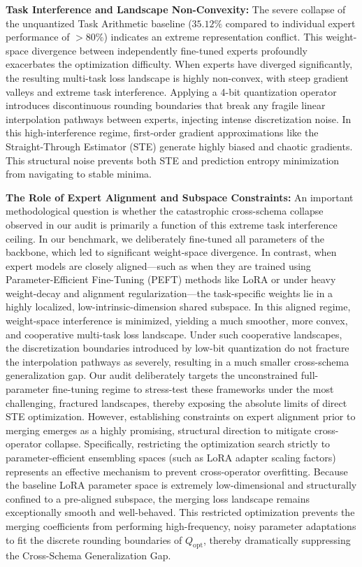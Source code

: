 \textbf{Task Interference and Landscape Non-Convexity:} The severe collapse of the unquantized Task Arithmetic baseline ($35.12\%$ compared to individual expert performance of $>80\%$) indicates an extreme representation conflict. This weight-space divergence between independently fine-tuned experts profoundly exacerbates the optimization difficulty. When experts have diverged significantly, the resulting multi-task loss landscape is highly non-convex, with steep gradient valleys and extreme task interference. Applying a 4-bit quantization operator introduces discontinuous rounding boundaries that break any fragile linear interpolation pathways between experts, injecting intense discretization noise. In this high-interference regime, first-order gradient approximations like the Straight-Through Estimator (STE) generate highly biased and chaotic gradients. This structural noise prevents both STE and prediction entropy minimization from navigating to stable minima. 

\textbf{The Role of Expert Alignment and Subspace Constraints:} An important methodological question is whether the catastrophic cross-schema collapse observed in our audit is primarily a function of this extreme task interference ceiling. In our benchmark, we deliberately fine-tuned all parameters of the backbone, which led to significant weight-space divergence. In contrast, when expert models are closely aligned---such as when they are trained using Parameter-Efficient Fine-Tuning (PEFT) methods like LoRA \cite{hu2021lora} or under heavy weight-decay and alignment regularization---the task-specific weights lie in a highly localized, low-intrinsic-dimension shared subspace. In this aligned regime, weight-space interference is minimized, yielding a much smoother, more convex, and cooperative multi-task loss landscape. Under such cooperative landscapes, the discretization boundaries introduced by low-bit quantization do not fracture the interpolation pathways as severely, resulting in a much smaller cross-schema generalization gap. Our audit deliberately targets the unconstrained full-parameter fine-tuning regime to stress-test these frameworks under the most challenging, fractured landscapes, thereby exposing the absolute limits of direct STE optimization. However, establishing constraints on expert alignment prior to merging emerges as a highly promising, structural direction to mitigate cross-operator collapse. Specifically, restricting the optimization search strictly to parameter-efficient ensembling spaces (such as LoRA adapter scaling factors) represents an effective mechanism to prevent cross-operator overfitting. Because the baseline LoRA parameter space is extremely low-dimensional and structurally confined to a pre-aligned subspace, the merging loss landscape remains exceptionally smooth and well-behaved. This restricted optimization prevents the merging coefficients from performing high-frequency, noisy parameter adaptations to fit the discrete rounding boundaries of $Q_{\text{opt}}$, thereby dramatically suppressing the Cross-Schema Generalization Gap.

